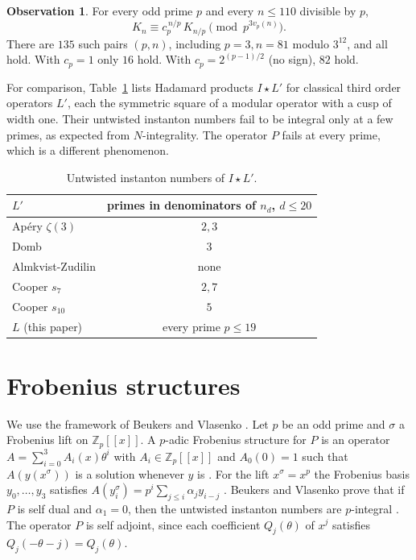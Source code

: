 \documentclass[11pt]{amsart}
\theoremstyle{definition}
\newtheorem{observation}[theorem]{Observation}
\theoremstyle{remark}
\newcommand{\Z}{\mathbb{Z}}
\begin{document}
\begin{observation}\label{obs:congruence}
For every odd prime $p$ and every $n\le110$ divisible by $p$,
\begin{equation}\label{eq:Cp}
K_n\equiv c_p^{\,n/p}\,K_{n/p}\pmod{p^{3v_p(n)}} .
\end{equation}
There are $135$ such pairs $(p,n)$, including $p=3,n=81$ modulo $3^{12}$, and all hold. With
$c_p=1$ only $16$ hold. With $c_p=2^{(p-1)/2}$ (no sign), $82$ hold.
\end{observation}

For comparison, Table~\ref{tab:controls} lists Hadamard products $I\star L'$ for classical third
order operators $L'$, each the symmetric square of a modular operator with a cusp of width one. Their
untwisted instanton numbers fail to be integral only at a few primes, as expected from
$N$-integrality. The operator $P$ fails at every prime, which is a different phenomenon.

\begin{table}[h]
\centering
\begin{tabular}{lc}
\toprule
$L'$ & primes in denominators of $n_d$, $d\le 20$\\
\midrule
Ap\'ery $\zeta(3)$ & $2,3$\\
Domb & $3$\\
Almkvist-Zudilin & none\\
Cooper $s_7$ & $2,7$\\
Cooper $s_{10}$ & $5$\\
$L$ (this paper) & every prime $p\le19$\\
\bottomrule
\end{tabular}
\caption{Untwisted instanton numbers of $I\star L'$.}\label{tab:controls}
\end{table}

\section{Frobenius structures}\label{sec:frobenius}

We use the framework of Beukers and Vlasenko \cite{BV}. Let $p$ be an odd prime and $\sigma$ a
Frobenius lift on $\Z_p[[x]]$. A $p$-adic Frobenius structure for $P$ is an operator
$A=\sum_{i=0}^3A_i(x)\theta^i$ with $A_i\in\Z_p[[x]]$ and $A_0(0)=1$ such that $A(y(x^\sigma))$ is
a solution whenever $y$ is \cite[Def.~1.1]{BV}. For the lift $x^\sigma=x^p$ the Frobenius basis
$y_0,\dots,y_3$ satisfies $A(y_i^\sigma)=p^i\sum_{j\le i}\alpha_jy_{i-j}$ \cite[Remark~1.2]{BV}.
Beukers and Vlasenko prove that if $P$ is self dual and $\alpha_1=0$, then the untwisted
instanton numbers are $p$-integral \cite[Thm.~1.7]{BV}. The operator $P$ is self adjoint, since each
coefficient $Q_j(\theta)$ of $x^j$ satisfies $Q_j(-\theta-j)=Q_j(\theta)$.
\end{document}
